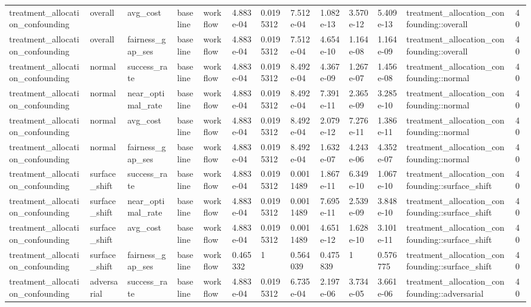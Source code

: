 \begin{tabular}{lllllllllllll}
treatment\_allocation\_confounding & overall & avg\_cost & baseline & workflow & 4.883e-04 & 0.0195312 & 7.512e-04 & 1.082e-13 & 3.570e-12 & 5.409e-13 & treatment\_allocation\_confounding::overall & 40 \\
treatment\_allocation\_confounding & overall & fairness\_gap\_ses & baseline & workflow & 4.883e-04 & 0.0195312 & 7.512e-04 & 4.654e-10 & 1.164e-08 & 1.164e-09 & treatment\_allocation\_confounding::overall & 40 \\
treatment\_allocation\_confounding & normal & success\_rate & baseline & workflow & 4.883e-04 & 0.0195312 & 8.492e-04 & 4.367e-09 & 1.267e-07 & 1.456e-08 & treatment\_allocation\_confounding::normal & 40 \\
treatment\_allocation\_confounding & normal & near\_optimal\_rate & baseline & workflow & 4.883e-04 & 0.0195312 & 8.492e-04 & 7.391e-11 & 2.365e-09 & 3.285e-10 & treatment\_allocation\_confounding::normal & 40 \\
treatment\_allocation\_confounding & normal & avg\_cost & baseline & workflow & 4.883e-04 & 0.0195312 & 8.492e-04 & 2.079e-12 & 7.276e-11 & 1.386e-11 & treatment\_allocation\_confounding::normal & 40 \\
treatment\_allocation\_confounding & normal & fairness\_gap\_ses & baseline & workflow & 4.883e-04 & 0.0195312 & 8.492e-04 & 1.632e-07 & 4.243e-06 & 4.352e-07 & treatment\_allocation\_confounding::normal & 40 \\
treatment\_allocation\_confounding & surface\_shift & success\_rate & baseline & workflow & 4.883e-04 & 0.0195312 & 0.0011489 & 1.867e-11 & 6.349e-10 & 1.067e-10 & treatment\_allocation\_confounding::surface\_shift & 40 \\
treatment\_allocation\_confounding & surface\_shift & near\_optimal\_rate & baseline & workflow & 4.883e-04 & 0.0195312 & 0.0011489 & 7.695e-11 & 2.539e-09 & 3.848e-10 & treatment\_allocation\_confounding::surface\_shift & 40 \\
treatment\_allocation\_confounding & surface\_shift & avg\_cost & baseline & workflow & 4.883e-04 & 0.0195312 & 0.0011489 & 4.651e-12 & 1.628e-10 & 3.101e-11 & treatment\_allocation\_confounding::surface\_shift & 40 \\
treatment\_allocation\_confounding & surface\_shift & fairness\_gap\_ses & baseline & workflow & 0.465332 & 1 & 0.564039 & 0.475839 & 1 & 0.576775 & treatment\_allocation\_confounding::surface\_shift & 40 \\
treatment\_allocation\_confounding & adversarial & success\_rate & baseline & workflow & 4.883e-04 & 0.0195312 & 6.735e-04 & 2.197e-06 & 3.734e-05 & 3.661e-06 & treatment\_allocation\_confounding::adversarial & 40 \\

\end{tabular}
